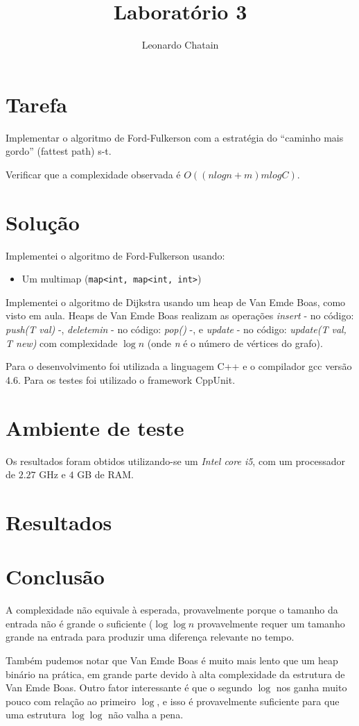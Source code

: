 \documentclass{article}
\title{Laboratório 3}
\author{Leonardo Chatain}
\begin{document}
\maketitle

\section{Tarefa}

Implementar o algoritmo de Ford-Fulkerson com a estratégia do ``caminho mais gordo'' (fattest path)
s-t.

Verificar que a complexidade observada é $ O((nlogn + m)m log C) $.

\section{Solução}

Implementei o algoritmo de Ford-Fulkerson usando:

\begin{itemize}
 \item Um multimap (\texttt{map<int, map<int, int>})
\end{itemize}

Implementei o algoritmo de Dijkstra usando um heap de Van Emde Boas, como visto em aula. Heaps de
Van Emde Boas realizam as operações \emph{insert} - no código: \emph{push(T val)} -,
\emph{deletemin} - no código: \emph{pop()} -, e \emph{update} - no código: \emph{update(T val, T
new)} com complexidade $ \log n $ (onde \emph{n} é o número de vértices do grafo).

Para o desenvolvimento foi utilizada a linguagem C++ e o compilador gcc versão 4.6. Para os testes
foi utilizado o framework CppUnit.

\section{Ambiente de teste}

Os resultados foram obtidos utilizando-se um \emph{Intel core i5}, com um processador de $2.27$ GHz
e $4$ GB de RAM.

\section{Resultados}


\section{Conclusão}

A complexidade não equivale à esperada, provavelmente porque o tamanho da entrada não é grande o
suficiente ($\log\log n$ provavelmente requer um tamanho grande na entrada para produzir uma
diferença relevante no tempo.

Também pudemos notar que Van Emde Boas é muito mais lento que um heap binário na prática, em grande
parte devido à alta complexidade da estrutura de Van Emde Boas. Outro fator interessante é que o
segundo $\log$ nos ganha muito pouco com relação ao primeiro $\log$, e isso é provavelmente
suficiente para que uma estrutura $\log\log$ não valha a pena.
\end{document}
